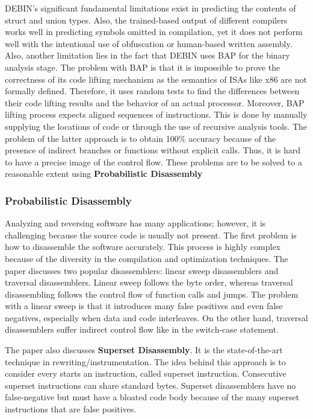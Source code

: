 \documentclass[conference,a4paper]{IEEEtran}
\begin{document}
DEBIN's significant fundamental limitations exist in predicting the contents of struct and union types. Also, the trained-based output of different compilers works well in predicting symbols omitted in compilation, yet it does not perform well with the intentional use of obfuscation or human-based written assembly. Also, another limitation lies in the fact that DEBIN uses BAP for the binary analysis stage. 
The problem with BAP is that it is impossible to prove the correctness of its code lifting mechanism as the semantics of ISAs like x86 are not formally defined. Therefore, it uses random tests to find the differences between their code lifting results and the behavior of an actual processor. Moreover, BAP lifting process expects aligned sequences of instructions. This is done by manually supplying the locations of code or through the use of recursive analysis tools.
\cite{brumley_bap_2011} The problem of the latter approach is to obtain 100\% accuracy because of the presence of indirect branches or functions without explicit calls. Thus, it is hard to have a precise image of the control flow. These problems are to be solved to a reasonable extent using \textbf{Probabilistic Disassembly}

\subsubsection{Probabilistic Disassembly}
Analyzing and reversing software has many applications; however, it is challenging because the source code is usually not present\cite{miller_probabilistic_2019}.
The first problem is how to disassemble the software accurately.
This process is highly complex because of the diversity in the compilation and optimization techniques.
The paper discusses two popular disassemblers: linear sweep disassemblers and traversal disassemblers.
Linear sweep follows the byte order, whereas traversal disassembling follows the control flow of function calls and jumps.
The problem with a linear sweep is that it introduces many false positives and even false negatives, especially when data and code interleaves. On the other hand, traversal disassemblers suffer indirect control flow like in the switch-case statement.

The paper also discusses \textbf{Superset Disassembly}. It is the state-of-the-art technique in rewriting/instrumentation. The idea behind this approach is to consider every starts an instruction, called superset instruction. Consecutive superset instructions can share standard bytes. Superset disassemblers have no false-negative but must have a bloated code body because of the many superset instructions that are false positives.
\end{document}
